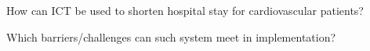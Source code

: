 How can ICT be used to shorten hospital stay for cardiovascular patients?

Which barriers/challenges can such system meet in implementation?




